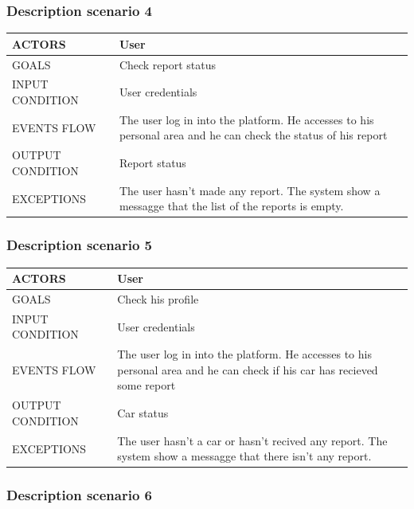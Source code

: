 \subsubsection{Description scenario 4}

\begin{center}
	\begin{tabular}{ | l | p{6cm} | } 
		\hline
		ACTORS & User  \\ 
		\hline
		GOALS & Check report status  \\ 
		\hline
		INPUT CONDITION & User credentials  \\ 
		\hline
		EVENTS FLOW & The user log in into the platform. He accesses to his personal area and he can check the status of his report \\ 
		\hline
		OUTPUT CONDITION & Report status \\ 
		\hline
		EXCEPTIONS & The user hasn't made any report. The system show a messagge that the list of the reports is empty.  \\ 
		\hline
	\end{tabular}
\end{center}

\subsubsection{Description scenario 5}

\begin{center}
	\begin{tabular}{ | l | p{6cm} | } 
		\hline
		ACTORS & User  \\ 
		\hline
		GOALS & Check his profile  \\ 
		\hline
		INPUT CONDITION & User credentials  \\ 
		\hline
		EVENTS FLOW & The user log in into the platform. He accesses to his personal area and he can check if his car has recieved some report \\ 
		\hline
		OUTPUT CONDITION & Car status \\ 
		\hline
		EXCEPTIONS & The user hasn't a car or hasn't recived any report. The system show a messagge that there isn't any report.  \\ 
		\hline
	\end{tabular}
\end{center}

\subsubsection{Description scenario 6}

